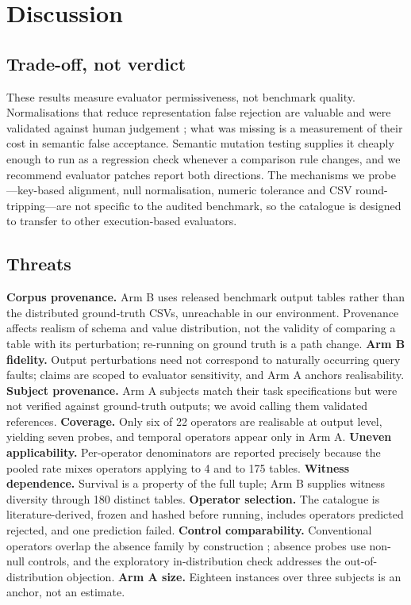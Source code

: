 \documentclass[10pt,conference]{IEEEtran}
\begin{document}
\section{Discussion}

\subsection{Trade-off, not verdict}

These results measure evaluator permissiveness, not benchmark quality.
Normalisations that reduce representation false rejection are valuable and were
validated against human judgement \cite{eltverified}; what was missing is a
measurement of their cost in semantic false acceptance. Semantic mutation testing
supplies it cheaply enough to run as a regression check whenever a comparison rule
changes, and we recommend evaluator patches report both directions. The mechanisms
we probe---key-based alignment, null normalisation, numeric tolerance and CSV
round-tripping---are not specific to the audited benchmark, so the catalogue is
designed to transfer to other execution-based evaluators.

\subsection{Threats}

\textbf{Corpus provenance.} Arm B uses released benchmark output tables rather than
the distributed ground-truth CSVs, unreachable in our environment. Provenance
affects realism of schema and value distribution, not the validity of comparing a
table with its perturbation; re-running on ground truth is a path change.
\textbf{Arm B fidelity.} Output perturbations need not correspond to naturally
occurring query faults; claims are scoped to evaluator sensitivity, and Arm A
anchors realisability.
\textbf{Subject provenance.} Arm A subjects match their task specifications but
were not verified against ground-truth outputs; we avoid calling them validated
references.
\textbf{Coverage.} Only six of 22 operators are realisable at output level,
yielding seven probes, and temporal operators appear only in Arm A.
\textbf{Uneven applicability.} Per-operator denominators are reported precisely
because the pooled rate mixes operators applying to 4 and to 175 tables.
\textbf{Witness dependence.} Survival is a property of the full tuple; Arm B
supplies witness diversity through 180 distinct tables.
\textbf{Operator selection.} The catalogue is literature-derived, frozen and hashed
before running, includes operators predicted rejected, and one prediction failed.
\textbf{Control comparability.} Conventional operators overlap the absence family
by construction \cite{tuya}; absence probes use non-null controls, and the
exploratory in-distribution check addresses the out-of-distribution objection.
\textbf{Arm A size.} Eighteen instances over three subjects is an anchor, not an
estimate.
\end{document}
